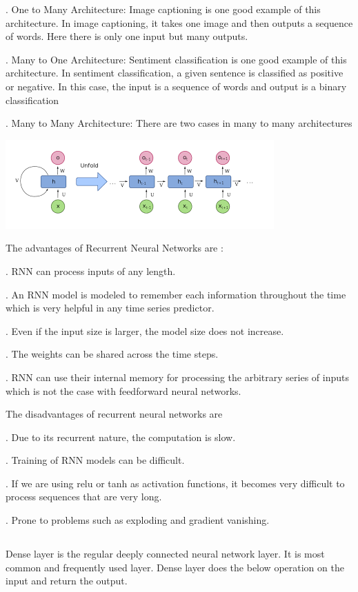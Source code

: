 \documentclass[12pt]{article}
\newcommand{\nd}{\noindent}
\newcommand{\msize}{\fontsize{14pt}{12pt}\selectfont}
\begin{document}
\nd 1. One to Many Architecture: Image captioning is one good example of this architecture. In image captioning, it takes one image and then outputs a sequence of words. Here there is only one input but many outputs.

\nd 2. Many to One Architecture: Sentiment classification is one good example of this architecture. In sentiment classification, a given sentence is classified as positive or negative. In this case, the input is a sequence of words and output is a binary classification

\nd 3. Many to Many Architecture: There are two cases in many to many architectures

\begin{center}
\centerline{\includegraphics[scale=.5]{seq.png}}
\end{center}

\nd The advantages of Recurrent Neural Networks are : 

\nd 1. RNN can process inputs of any length.

\nd 2. An RNN model is modeled to remember each information throughout the time which is very helpful in any time series predictor.

\nd 3. Even if the input size is larger, the model size does not increase.

\nd 4. The weights can be shared across the time steps.

\nd 5. RNN can use their internal memory for processing the arbitrary series of inputs which is not the case with feedforward neural networks.

\nd The disadvantages of recurrent neural networks are 

\nd 1. Due to its recurrent nature, the computation is slow.

\nd 2. Training of RNN models can be difficult.

\nd 3. If we are using relu or tanh as activation functions, it becomes very difficult to process sequences that are very long.

\nd 4. Prone to problems such as exploding and gradient vanishing.

\newpage 
\subsection{\msize{\textbf{\textbf{DENSE NETWORKS}}}}
Dense layer is the regular deeply connected neural network layer. It is most common and frequently used layer. Dense layer does the below operation on the input and return the output.
\end{document}
